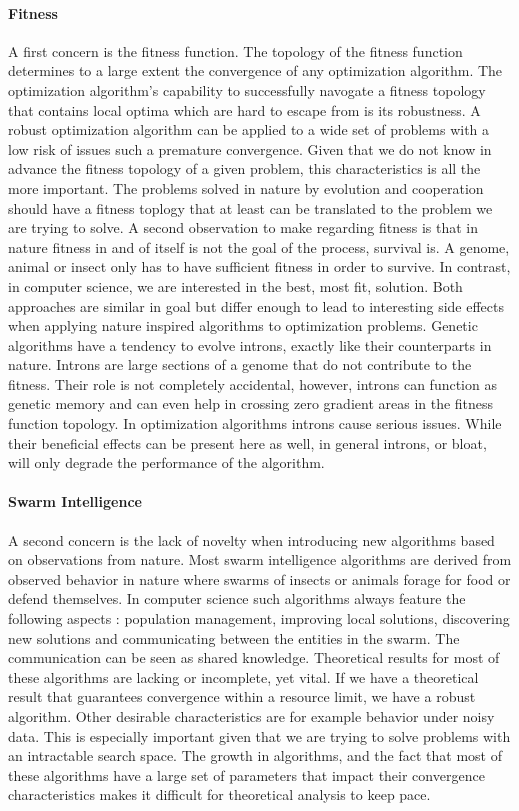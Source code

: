 \paragraph{Fitness}
A first concern is the fitness function. The topology of the fitness function determines to a large extent the convergence of any optimization algorithm. The optimization algorithm's capability to successfully navogate a fitness topology that contains local optima which are hard to escape from is its robustness. A robust optimization algorithm can be applied to a wide set of problems with a low risk of issues such a premature convergence. Given that we do not know in advance the fitness topology of a given problem, this characteristics is all the more important.
The problems solved in nature by evolution and cooperation should have a fitness toplogy that at least can be translated to the problem we are trying to solve. A second observation to make regarding fitness is that in nature fitness in and of itself is not the goal of the process, survival is. A genome, animal or insect only has to have sufficient fitness in order to survive. In contrast, in computer science, we are interested in the best, most fit, solution. Both approaches are similar in goal but differ enough to lead to interesting side effects when applying nature inspired algorithms to optimization problems. Genetic algorithms have a tendency to evolve introns, exactly like their counterparts in nature. Introns are large sections of a genome that do not contribute to the fitness. Their role is not completely accidental, however, introns can function as genetic memory and can even help in crossing zero gradient areas in the fitness function topology. 
In optimization algorithms introns cause serious issues. While their beneficial effects can be present here as well, in general introns, or bloat, will only degrade the performance of the algorithm. 
\paragraph{Swarm Intelligence}
A second concern is the lack of novelty when introducing new algorithms based on observations from nature. Most swarm intelligence algorithms are derived from observed behavior in nature where swarms of insects or animals forage for food or defend themselves. 
In computer science such algorithms always feature the following aspects : population management, improving local solutions, discovering new solutions and communicating between the entities in the swarm. The communication can be seen as shared knowledge.
Theoretical results for most of these algorithms are lacking or incomplete, yet vital. If we have a theoretical result that guarantees convergence within a resource limit, we have a robust algorithm. Other desirable characteristics are for example behavior under noisy data. \citep{ACONoise}
This is especially important given that we are trying to solve problems with an intractable search space. The growth in algorithms, and the fact that most of these algorithms have a large set of parameters that impact their convergence characteristics makes it difficult for theoretical analysis to keep pace.

